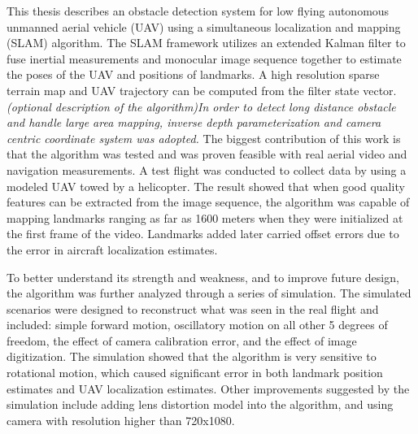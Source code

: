 This thesis describes an obstacle detection system for low flying
autonomous unmanned aerial vehicle (UAV) using a simultaneous
localization and mapping (SLAM) algorithm.
The SLAM framework utilizes an extended Kalman filter to fuse inertial
measurements and monocular image sequence together to estimate the
poses of the UAV and positions of landmarks. A high resolution sparse
terrain map and UAV trajectory can be computed from the filter state
vector. 
\emph{(optional description of the algorithm)In order to
detect long distance obstacle and handle large area mapping, inverse
depth parameterization and camera centric coordinate system was
adopted.}
The biggest contribution of this work is that the algorithm was tested
and was proven feasible with real aerial video and navigation measurements.
A test flight was conducted to collect data by using a modeled UAV towed
by a helicopter. The result showed that when good quality features can
be extracted from the image sequence, the algorithm was capable of
mapping landmarks ranging as far as 1600 meters when they were
initialized at the first frame of the video. Landmarks added later
carried offset errors due to the error in aircraft localization
estimates.

To better understand its strength and weakness, and to improve future
design, the algorithm was further analyzed through a series of
simulation. The simulated scenarios were designed to
reconstruct what was seen in the real flight and included: simple
forward motion, oscillatory motion on all other 5 degrees of freedom,
the effect of camera calibration error, and the effect of image
digitization. The simulation showed that the algorithm is very
sensitive to rotational motion, which caused significant error in both
landmark position estimates and UAV localization estimates. Other
improvements suggested by the simulation include adding lens
distortion model into the algorithm, and using camera with resolution
higher than 720x1080.
